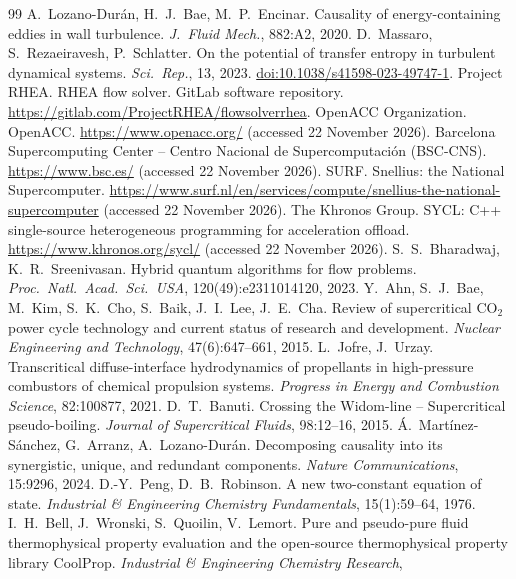 \documentclass[11pt]{article}
\begin{document}
\begin{thebibliography}{99}
 A.\ Lozano-Dur\'an, H.\ J.\ Bae, M.\ P.\ Encinar. Causality of energy-containing eddies in wall turbulence. \emph{J.\ Fluid Mech.}, 882:A2, 2020.
 D.\ Massaro, S.\ Rezaeiravesh, P.\ Schlatter. On the potential of transfer entropy in turbulent dynamical systems. \emph{Sci.\ Rep.}, 13, 2023. \href{https://doi.org/10.1038/s41598-023-49747-1}{doi:10.1038/s41598-023-49747-1}.
 Project RHEA. RHEA flow solver. GitLab software repository. \url{https://gitlab.com/ProjectRHEA/flowsolverrhea}.
 OpenACC Organization. OpenACC. \url{https://www.openacc.org/} (accessed 22 November 2026).
 Barcelona Supercomputing Center -- Centro Nacional de Supercomputaci\'on (BSC-CNS). \url{https://www.bsc.es/} (accessed 22 November 2026).
 SURF. Snellius: the National Supercomputer. \url{https://www.surf.nl/en/services/compute/snellius-the-national-supercomputer} (accessed 22 November 2026).
 The Khronos Group. SYCL: C++ single-source heterogeneous programming for acceleration offload. \url{https://www.khronos.org/sycl/} (accessed 22 November 2026).
 S.\ S.\ Bharadwaj, K.\ R.\ Sreenivasan. Hybrid quantum algorithms for flow problems. \emph{Proc.\ Natl.\ Acad.\ Sci.\ USA}, 120(49):e2311014120, 2023.
 Y.\ Ahn, S.\ J.\ Bae, M.\ Kim, S.\ K.\ Cho, S.\ Baik, J.\ I.\ Lee, J.\ E.\ Cha.
Review of supercritical CO$_2$ power cycle technology and current status of research and
development. \emph{Nuclear Engineering and Technology}, 47(6):647--661, 2015.
 L.\ Jofre, J.\ Urzay. Transcritical diffuse-interface hydrodynamics
of propellants in high-pressure combustors of chemical propulsion systems. \emph{Progress
in Energy and Combustion Science}, 82:100877, 2021.
 D.\ T.\ Banuti. Crossing the Widom-line -- Supercritical pseudo-boiling.
\emph{Journal of Supercritical Fluids}, 98:12--16, 2015.
 \'A.\ Mart\'inez-S\'anchez, G.\ Arranz, A.\ Lozano-Dur\'an.
Decomposing causality into its synergistic, unique, and redundant components. \emph{Nature
Communications}, 15:9296, 2024.
 D.-Y.\ Peng, D.\ B.\ Robinson. A new two-constant equation of
state. \emph{Industrial \& Engineering Chemistry Fundamentals}, 15(1):59--64, 1976.
 I.\ H.\ Bell, J.\ Wronski, S.\ Quoilin, V.\ Lemort. Pure and
pseudo-pure fluid thermophysical property evaluation and the open-source thermophysical
property library CoolProp. \emph{Industrial \& Engineering Chemistry Research},

\end{thebibliography}
\end{document}
